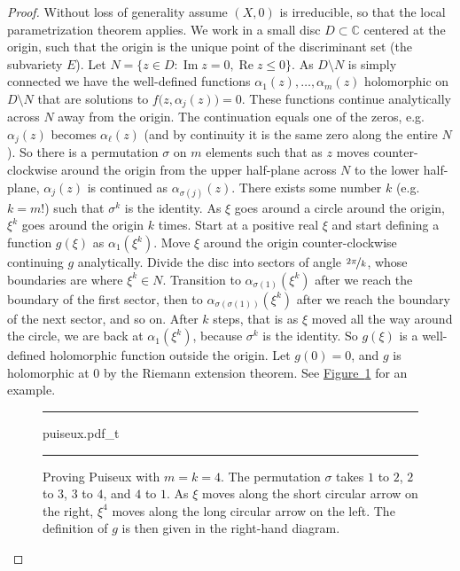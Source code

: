\documentclass[12pt,openany]{book}
\renewcommand{\Re}{\operatorname{Re}}
\renewcommand{\Im}{\operatorname{Im}}
\newcommand{\C}{{\mathbb{C}}}
\theoremstyle{plain}
\theoremstyle{remark}
\theoremstyle{definition}
\newenvironment{myfig}{%
\begin{figure}[h!t]
\noindent\rule{\textwidth}{0.5pt}\vspace{12pt}\par\centering}%
{\par\noindent\rule{\textwidth}{0.5pt}
\end{figure}}
\theoremstyle{exercise}
\theoremstyle{example}
\newcommand{\figureref}[1]{\hyperref[#1]{Figure~\ref*{#1}}}
\begin{document}
\begin{proof}
Without loss of generality
assume $(X,0)$
is irreducible, so that
the local parametrization theorem applies.
We work in a small disc $D \subset \C$ centered at the origin, such that the
origin is the unique point of the discriminant set (the subvariety
$E$).  Let $N = \{ z \in D : \Im z = 0 , \Re z \leq 0 \}$.
As $D \setminus N$ is simply connected we have the well-defined functions
$\alpha_1(z),\ldots,\alpha_m(z)$ holomorphic on $D \setminus N$
that are solutions to $f\bigl(z,\alpha_j(z)\bigr) = 0$.
These functions continue analytically across $N$ away from the
origin.  The continuation equals one of the zeros, e.g.\ $\alpha_j(z)$
becomes $\alpha_\ell(z)$ (and by continuity it is the
same zero along the entire $N$).  So there is
a permutation $\sigma$ on $m$ elements such that as $z$ moves
counter-clockwise around the origin from the upper half-plane across $N$ to the
lower half-plane,
$\alpha_j(z)$ is continued as $\alpha_{\sigma(j)}(z)$.
There exists some number $k$ (e.g.\ $k=m!$) such that $\sigma^k$ is the identity.
As $\xi$ goes around
a circle around the origin, $\xi^k$ goes around the origin $k$ times.
Start at a positive real $\xi$ and start defining a
function $g(\xi)$ as
$\alpha_1(\xi^k)$.
Move $\xi$ around the origin counter-clockwise continuing $g$ analytically.
Divide the disc into sectors of angle $\nicefrac{2\pi}{k}$,
whose boundaries are where $\xi^k \in N$.
Transition to $\alpha_{\sigma(1)}(\xi^k)$ after we reach the boundary
of the first sector, then to
$\alpha_{\sigma(\sigma(1))}(\xi^k)$ after we reach the boundary of the next sector, and so on.
After $k$ steps, that is as
$\xi$ moved all the way around the circle,
we are back at $\alpha_1(\xi^k)$,
because
$\sigma^k$ is the identity.
So $g(\xi)$ is a well-defined holomorphic function outside the origin.  Let
$g(0) = 0$, and $g$ is holomorphic at $0$ by the Riemann extension theorem.
See \figureref{fig:puiseux} for an example.
\begin{myfig}
{puiseux.pdf_t}
\caption{Proving Puiseux with $m = k = 4$.  The permutation $\sigma$ takes
$1$ to $2$, $2$ to $3$, $3$ to $4$,
and $4$ to $1$.  As $\xi$ moves along the short circular arrow on the right, $\xi^4$
moves along the long circular arrow on the left.  The definition of $g$ is
then given in the right-hand diagram.\label{fig:puiseux}}
\end{myfig}
\end{proof}
\end{document}
